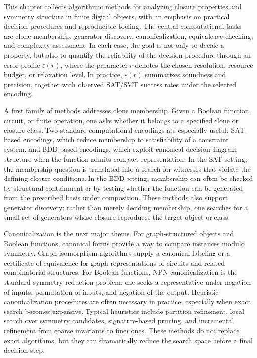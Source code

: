 This chapter collects algorithmic methods for analyzing closure properties and symmetry structure in finite digital objects, with an emphasis on practical decision procedures and reproducible tooling. The central computational tasks are clone membership, generator discovery, canonicalization, equivalence checking, and complexity assessment. In each case, the goal is not only to decide a property, but also to quantify the reliability of the decision procedure through an error profile \(\varepsilon(r)\), where the parameter \(r\) denotes the chosen resolution, resource budget, or relaxation level. In practice, \(\varepsilon(r)\) summarizes soundness and precision, together with observed SAT/SMT success rates under the selected encoding.

A first family of methods addresses clone membership. Given a Boolean function, circuit, or finite operation, one asks whether it belongs to a specified clone or closure class. Two standard computational encodings are especially useful: SAT-based encodings, which reduce membership to satisfiability of a constraint system, and BDD-based encodings, which exploit canonical decision-diagram structure when the function admits compact representation. In the SAT setting, the membership question is translated into a search for witnesses that violate the defining closure conditions. In the BDD setting, membership can often be checked by structural containment or by testing whether the function can be generated from the prescribed basis under composition. These methods also support generator discovery: rather than merely deciding membership, one searches for a small set of generators whose closure reproduces the target object or class.

Canonicalization is the next major theme. For graph-structured objects and Boolean functions, canonical forms provide a way to compare instances modulo symmetry. Graph isomorphism algorithms supply a canonical labeling or a certificate of equivalence for graph representations of circuits and related combinatorial structures. For Boolean functions, NPN canonicalization is the standard symmetry-reduction problem: one seeks a representative under negation of inputs, permutation of inputs, and negation of the output. Heuristic canonicalization procedures are often necessary in practice, especially when exact search becomes expensive. Typical heuristics include partition refinement, local search over symmetry candidates, signature-based pruning, and incremental refinement from coarse invariants to finer ones. These methods do not replace exact algorithms, but they can dramatically reduce the search space before a final decision step.

